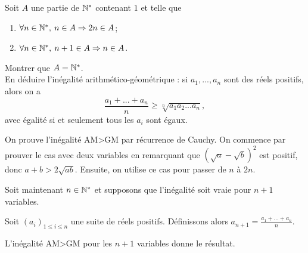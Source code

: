 \begin{exo} 
Soit $A$ une partie de $\mathbb N^*$ contenant $1$ et telle que
\begin{enumerate}
\item $\forall n\in \mathbb N^*,\: n\in A \Rightarrow 2n \in A$;
\item $\forall n\in \mathbb N^*,\: n+1\in A \Rightarrow n \in A$.
\end{enumerate}
Montrer que $A = \mathbb N^*$.\\
En déduire l'inégalité arithmético-géométrique : si $a_1, ..., a_n$ sont des réels positifs, alors on a 
\[ \frac{a_1+...+a_n}{n} \geq \sqrt[n]{a_1 a_2  ...   a_n},\]
avec égalité si et seulement tous les $a_i$ sont égaux.
\begin{sol}
On prouve l'inégalité AM>GM par récurrence de Cauchy. On commence par prouver le cas avec deux variables en remarquant que $(\sqrt a - \sqrt b)^2$ est positif, donc $a+b > 2\sqrt {ab}$. Ensuite, on utilise ce cas pour passer de $n$ à $2n$.

Soit maintenant $n \in \mathbb N^*$ et supposons que l'inégalité soit vraie pour $n+1$ variables. 

Soit $(a_i)_{1\leq i\leq n}$ une suite de réels positifs. Définissons alors $a_{n+1} = \frac{a_1+...+a_n}{n}$.

L'inégalité AM>GM pour les $n+1$ variables donne le résultat.
\end{sol}
\end{exo}



